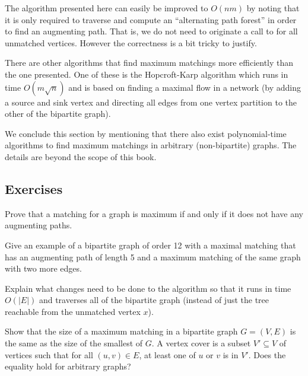 The algorithm presented here can easily be improved to $O(nm)$ by
noting that it is only required to traverse and compute an 
``alternating path forest'' in order to find an augmenting path.  
That is, we do not need to originate a call to  for all 
unmatched vertices. However the correctness is a bit tricky to justify.

There are other algorithms that find maximum matchings more efficiently
than the one presented.  One of these is the Hopcroft-Karp algorithm
which runs in time $O(m\sqrt{n})$ and is based on finding a maximal 
flow in a network (by adding a source and sink vertex and directing all edges
from one vertex partition to the other of the bipartite graph).

We conclude this section by mentioning that there also exist
poly\-nomial-time algorithms to find maximum matchings in arbitrary
(non-bipartite) graphs. The details are beyond the scope of this book.

\subsection*{Exercises}

\begin{Exercise}\label{ex:agpath}
Prove that a matching for a graph is maximum if and only if it does not
have any augmenting paths.
\end{Exercise}

\begin{Exercise}
Give an example of a bipartite graph of order 12 with a maximal matching 
that has an augmenting path of length 5 and a maximum matching of 
the same graph with two more edges.
\end{Exercise}

\begin{Exercise}
Explain what changes need to be done to the algorithm
so that it runs in time $O(|E|)$ and traverses all of the bipartite graph
(instead of just the tree reachable from the unmatched vertex $x$).
\end{Exercise}
\fi

\begin{Exercise}\label{ex:konig}
Show that the size of a maximum matching in a bipartite graph $G=(V,E)$ is the
same as the size of the smallest  of $G$.  A vertex cover
is a subset $V' \subseteq V$ of vertices such that for 
all $(u,v) \in E$, at least one of $u$ or $v$ is in $V'$.
Does the equality hold for arbitrary graphs?
\end{Exercise}

